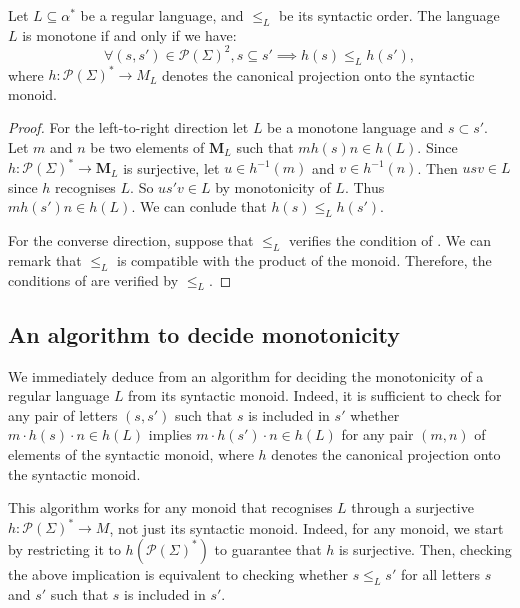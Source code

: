 \documentclass[a4paper,UKenglish,cleveref, autoref, thm-restate]{lipics-v2021}
\renewcommand{\alph}{\part(\Sigma)}
\newcommand{\op}{\cdot}
\renewcommand{\part}{\mathcal{P}}
\newcommand{\M}{\mathbf{M}}
\begin{document}
\begin{theorem}\label{caracmonot}
    Let $L\subseteq\alpha^*$ be a regular language, and $\leq_L$ be its syntactic order. The language $L$ is monotone if and only if we have:
    $$
    \forall (s,s') \in \alph^2, s \subseteq s' \implies h(s) \leq_L h(s'),
    $$
    where $h:\alph^*\to M_L$ denotes the canonical projection onto the syntactic monoid.
\end{theorem}


\begin{proof}
    For the left-to-right direction let $L$ be a monotone language and $s \subset s'$.
    Let $m$ and $n$ be two elements of $\M_L$ such that $mh(s)n \in h(L)$.
    Since $h : \alph^* \to \M_L$ is surjective, let $u \in h^{-1}(m)$ and $v \in h^{-1}(n)$.
    Then $usv \in L$ since $h$ recognises $L$.
    So $us'v \in L$ by monotonicity of $L$.
    Thus $mh(s')n \in h(L)$.
    We can conlude that $h(s) \leq_L h(s')$.
    



    For the converse direction, suppose that $\leq_L$ verifies the condition of .
    We can remark that $\leq_L$ is compatible with the product of the monoid.
    Therefore, the conditions of  are verified by $\leq_L$.


\end{proof}







\subsection{An algorithm to decide monotonicity} \label{sec:algo}


We immediately deduce from  an algorithm for deciding the monotonicity of a regular language $L$ from its syntactic monoid. Indeed, it is sufficient to check for any pair of letters $(s,s')$ such that $s$ is included in $s'$ whether $m \op h(s) \op n \in h(L)$ implies $m \op h(s') \op n \in h(L)$ for any pair $(m,n)$ of elements of the syntactic monoid, where $h$ denotes the canonical projection onto the syntactic monoid.

This algorithm works for any monoid that recognises $L$ through a surjective $h:\alph^*\to M$, not just its syntactic monoid.
Indeed, for any monoid, we start by restricting it to $h(\alph^*)$ to guarantee that $h$ is surjective.
Then, checking the above implication is equivalent to checking whether $s \leq_L s'$ for all letters $s$ and $s'$ such that $s$ is included in $s'$.
\end{document}
